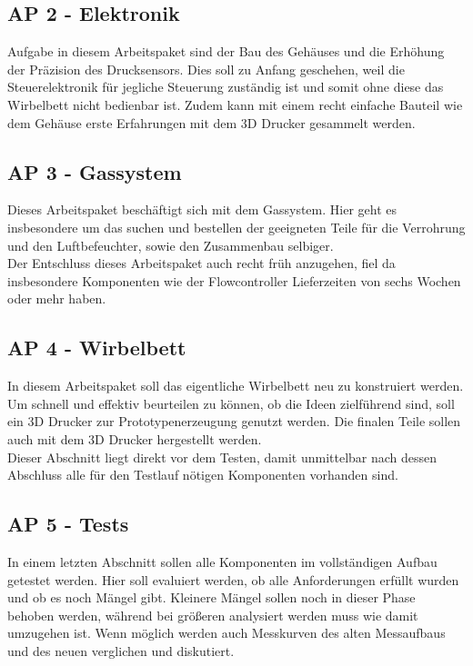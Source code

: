 \subsection{AP 2 - Elektronik}

Aufgabe in diesem Arbeitspaket sind der Bau des Gehäuses und die Erhöhung der Präzision des Drucksensors. Dies soll zu Anfang geschehen, weil die Steuerelektronik für jegliche Steuerung zuständig ist und somit ohne diese das Wirbelbett nicht bedienbar ist. Zudem kann mit einem recht einfache Bauteil wie dem Gehäuse erste Erfahrungen mit dem 3D Drucker gesammelt werden.

\subsection{AP 3 - Gassystem}

Dieses Arbeitspaket beschäftigt sich mit dem Gassystem. Hier geht es insbesondere um das suchen und bestellen der geeigneten Teile für die Verrohrung und den Luftbefeuchter, sowie den Zusammenbau selbiger. \\
Der Entschluss dieses Arbeitspaket auch recht früh anzugehen, fiel da insbesondere Komponenten wie der Flowcontroller Lieferzeiten von sechs Wochen oder mehr haben. 

\subsection{AP 4 - Wirbelbett}

In diesem Arbeitspaket soll das eigentliche Wirbelbett neu zu konstruiert werden. Um schnell und effektiv beurteilen zu können, ob die Ideen zielführend sind, soll ein 3D Drucker zur Prototypenerzeugung genutzt werden. Die finalen Teile sollen auch mit dem 3D Drucker hergestellt werden. \\
Dieser Abschnitt liegt direkt vor dem Testen, damit unmittelbar nach dessen Abschluss alle für den Testlauf nötigen Komponenten vorhanden sind.


\subsection{AP 5 - Tests}

In einem letzten Abschnitt sollen alle Komponenten im vollständigen Aufbau getestet werden. Hier soll evaluiert werden, ob alle Anforderungen erfüllt wurden und ob es noch Mängel gibt. Kleinere Mängel sollen noch in dieser Phase behoben werden, während bei größeren analysiert werden muss wie damit umzugehen ist. Wenn möglich werden auch Messkurven des alten Messaufbaus und des neuen verglichen und diskutiert.


